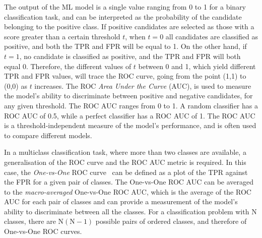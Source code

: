 The output of the ML model is a single value ranging from 0 to 1 for a binary classification task, and can be interpreted as the probability of the candidate belonging to the positive class. If positive candidates are selected as those with a score greater than a certain threshold $t$, when $t=0$ all candidates are classified as positive, and both the TPR and FPR will be equal to 1. On the other hand, if $t=1$, no candidate is classified as positive, and the TPR and FPR will both equal 0. Therefore, the different values of $t$ between 0 and 1, which yield different TPR and FPR values, will trace the ROC curve, going from the point (1,1) to (0,0) as $t$ increases. The ROC \emph{Area Under the Curve} (AUC), is used to measure the model's ability to discriminate between positive and negative candidates, for any given threshold. The ROC AUC ranges from 0 to 1. A random classifier has a ROC AUC of 0.5, while a perfect classifier has a ROC AUC of 1. The ROC AUC is a threshold-independent measure of the model's performance, and is often used to compare different models. 

In a multiclass classification task, where more than two classes are available, a generalisation of the ROC curve and the ROC AUC metric is required. In this case, the \emph{One-vs-One} ROC curve~\cite{hand2001simple} can be defined as a plot of the TPR against the FPR for a given pair of classes. The One-vs-One ROC AUC can be averaged to the \emph{macro-averaged} One-vs-One ROC AUC, which is the average of the ROC AUC for each pair of classes and can provide a measurement of the model's ability to discriminate between all the classes. For a classification problem with N classes, there are $\mathrm{N(N-1)}$ possible pairs of ordered classes, and therefore of One-vs-One ROC curves. 


